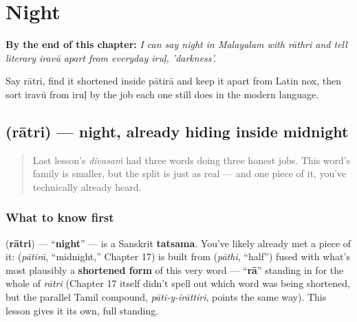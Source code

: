 
\chapter{Night}
\label{ch:ml-night}

\begin{chapteropening}
\textbf{By the end of this chapter:} \emph{I can say night in Malayalam with rāthri and tell literary iravŭ apart from everyday iruḷ, 'darkness'.}

Say rātri, find it shortened inside pātirā and keep it apart from Latin nox, then sort iravŭ from iruḷ by the job each one still does in the modern language.
\end{chapteropening}

\section[\texorpdfstring{\ml{രാത്രി} (rātri)}{രാത്രി (rātri)}]{ (rātri) — night, already hiding inside midnight}

\label{lesson:ML-C24-rathri}



\begin{quote}
Last lesson's \emph{divasaṁ} had three words doing three honest jobs. This word's family is smaller, but the split is just as real — and one piece of it, you've technically already heard.
\end{quote}

\subsection*{What to know first}
\textbf{} (\textbf{rātri}) — \textquotedblleft{}\textbf{night}\textquotedblright{} — is a Sanskrit \textbf{tatsama}. You've likely already met a piece of it: \textbf{} (\emph{pātirā}, \textquotedblleft{}midnight,\textquotedblright{} Chapter 17) is built from \textbf{} (\emph{pāthi}, \textquotedblleft{}half\textquotedblright{}) fused with what's most plausibly a \textbf{shortened form} of this very word — \textquotedblleft{}\textbf{rā}\textquotedblright{} standing in for the whole of \emph{rātri} (Chapter 17 itself didn't spell out which word was being shortened, but the parallel Tamil compound, \emph{pāti-y-irāttiri}, points the same way). This lesson gives it its own, full standing.

